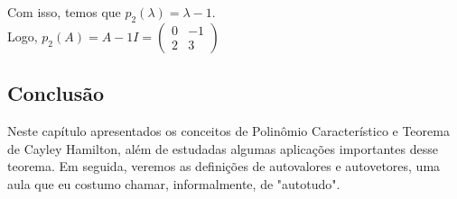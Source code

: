 \documentclass[12pt]{article}
\begin{document}
Com isso, temos que $p_2(\lambda)=\lambda-1$.\\

Logo,  $p_2(A)=A-1I=\begin{pmatrix}
	0 & -1 \\
	2 & 3
\end{pmatrix}
$

\subsection{Conclusão}
Neste capítulo apresentados os conceitos de  Polinômio Característico e Teorema de Cayley Hamilton, além de estudadas algumas aplicações importantes desse teorema. Em seguida, veremos as definições de autovalores e autovetores, uma aula que eu costumo chamar, informalmente, de "autotudo".
\end{document}
